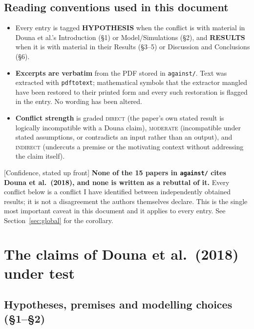 \documentclass[11pt,a4paper]{article}
\newcommand{\HYP}{\textcolor{blue!60!black}{\textbf{HYPOTHESIS}}}
\newcommand{\RES}{\textcolor{red!60!black}{\textbf{RESULTS}}}
\newcommand{\flag}[1]{\textcolor{orange!75!black}{\textsf{\small [#1]}}}
\begin{document}
\subsection{Reading conventions used in this document}

\begin{itemize}[leftmargin=*,itemsep=2pt]
\item Every entry is tagged \HYP{} when the conflict is with material in
      Douna et al.'s Introduction (\S1) or Model/Simulations (\S2), and
      \RES{} when it is with material in their Results (\S3--5) or
      Discussion and Conclusions (\S6).
\item \textbf{Excerpts are verbatim} from the PDF stored in \texttt{against/}.
      Text was extracted with \texttt{pdftotext}; mathematical symbols that the
      extractor mangled have been restored to their printed form and every such
      restoration is flagged in the entry. No wording has been altered.
\item \textbf{Conflict strength} is graded
      \textsc{direct} (the paper's own stated result is logically incompatible
      with a Douna claim),
      \textsc{moderate} (incompatible under stated assumptions, or contradicts
      an input rather than an output), and
      \textsc{indirect} (undercuts a premise or the motivating context without
      addressing the claim itself).
\end{itemize}

\flag{Confidence, stated up front} \textbf{None of the 15 papers in
\texttt{against/} cites Douna et al.\ (2018), and none is written as a rebuttal
of it.} Every conflict below is a conflict I have identified between
independently obtained results; it is not a disagreement the authors themselves
declare. This is the single most important caveat in this document and it
applies to every entry. See Section~\ref{sec:global} for the corollary.

\section{The claims of Douna et al.\ (2018) under test}
\label{sec:claims}

\subsection{Hypotheses, premises and modelling choices (\S1--\S2)}
\end{document}
